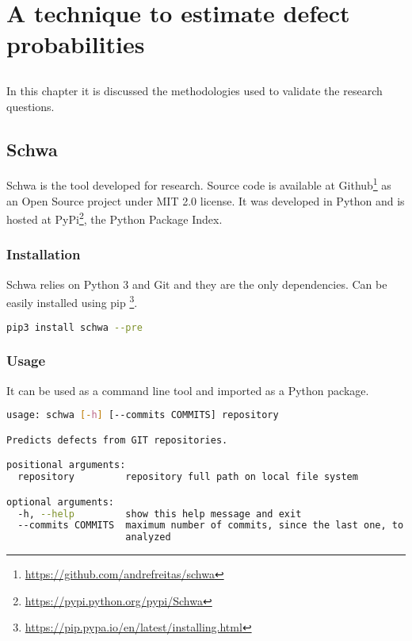 \chapter{A technique to estimate defect probabilities} \label{chap:methods}

\section*{}
In this chapter it is discussed the methodologies used to validate the research questions.

\section{Schwa}
Schwa is the tool developed for research. Source code is available at Github\footnote{\url{https://github.com/andrefreitas/schwa}} as an Open Source project under MIT 2.0 license. It was developed in Python and is hosted at PyPi\footnote{\url{https://pypi.python.org/pypi/Schwa}}, the Python Package Index. 

\subsection{Installation}
Schwa relies on Python 3 and Git and they are the only dependencies. Can be easily installed using pip \footnote{\url{https://pip.pypa.io/en/latest/installing.html}}. 

\begin{lstlisting}[language=bash, caption=Schwa installation command]
   pip3 install schwa --pre
\end{lstlisting}

\subsection{Usage}
It can be used as a command line tool and imported as a Python package.

\begin{lstlisting}[language=bash, caption=Schwa CLI options]
usage: schwa [-h] [--commits COMMITS] repository

Predicts defects from GIT repositories.

positional arguments:
  repository         repository full path on local file system

optional arguments:
  -h, --help         show this help message and exit
  --commits COMMITS  maximum number of commits, since the last one, to be
                     analyzed
\end{lstlisting}


